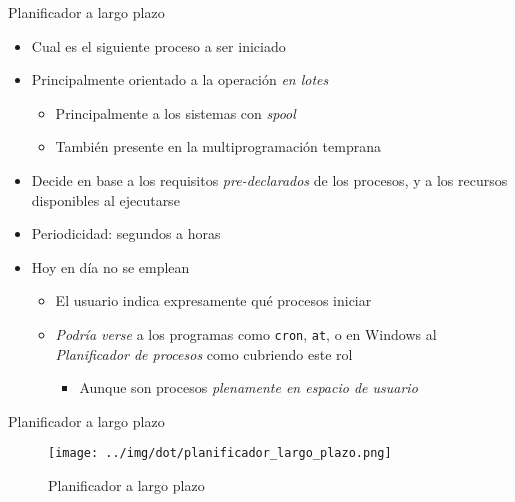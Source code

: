 \documentclass[presentation]{beamer}
\begin{document}
\begin{frame}[label={sec:orge818494},fragile]{Planificador a largo plazo}
 \begin{itemize}
\item Cual es el siguiente proceso a ser iniciado
\item Principalmente orientado a la operación \emph{en lotes}
\begin{itemize}
\item Principalmente a los sistemas con \emph{spool}
\item También presente en la multiprogramación temprana
\end{itemize}
\item Decide en base a los requisitos \emph{pre-declarados} de los procesos, y
a los recursos disponibles al ejecutarse
\item Periodicidad: segundos a horas
\item Hoy en día no se emplean
\begin{itemize}
\item El usuario indica expresamente qué procesos iniciar
\item \emph{Podría verse} a los programas como \texttt{cron}, \texttt{at}, o en Windows al
\emph{Planificador de procesos} como cubriendo este rol
\begin{itemize}
\item Aunque son procesos \emph{plenamente en espacio de usuario}
\end{itemize}
\end{itemize}
\end{itemize}
\end{frame}

\begin{frame}[label={sec:org7a0e8a7}]{Planificador a largo plazo}
\begin{figure}[htbp]
\centering
\texttt{[image: ../img/dot/planificador\_largo\_plazo.png]}
\caption{Planificador a largo plazo}
\end{figure}
\end{frame}
\end{document}
